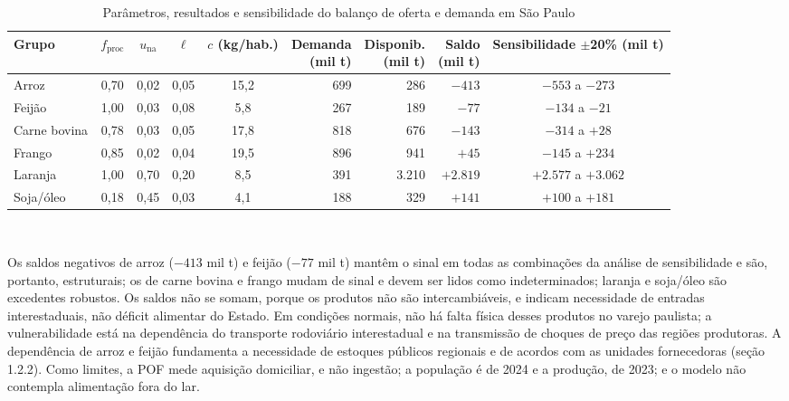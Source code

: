 \documentclass[
	12pt,				%
	openright,			%
	oneside,			%
	a4paper,			%
	chapter=TITLE,		%
	section=TITLE,		%
	english,			%
	french,				%
	spanish,			%
	brazil,				%
 ]{abntex2}
\begin{document}
\begin{table}[!htbp]
\centering
\caption{Parâmetros, resultados e sensibilidade do balanço de oferta e demanda em São Paulo}
\label{tab:balanco-oferta-demanda-sp}
\footnotesize
\setlength{\tabcolsep}{3pt}
\begin{tabular}{|l|c|c|c|c|r|r|r|c|}
\hline
\textbf{Grupo} & $f_{\mathrm{proc}}$ & $u_{\mathrm{na}}$ & $\ell$ & \shortstack{$c$\\(kg/hab.)} & \shortstack{\textbf{Demanda}\\(mil t)} & \shortstack{\textbf{Disponib.}\\(mil t)} & \shortstack{\textbf{Saldo}\\(mil t)} & \shortstack{\textbf{Sensibilidade}\\$\pm$20\% (mil t)} \\
\hline
Arroz        & 0,70 & 0,02 & 0,05 & 15,2 & 699 & 286   & $-413$ & $-553$ a $-273$ \\
\hline
Feijão       & 1,00 & 0,03 & 0,08 & 5,8  & 267 & 189   & $-77$  & $-134$ a $-21$ \\
\hline
Carne bovina & 0,78 & 0,03 & 0,05 & 17,8 & 818 & 676   & $-143$ & $-314$ a $+28$ \\
\hline
Frango       & 0,85 & 0,02 & 0,04 & 19,5 & 896 & 941   & $+45$  & $-145$ a $+234$ \\
\hline
Laranja      & 1,00 & 0,70 & 0,20 & 8,5  & 391 & 3.210 & $+2.819$ & $+2.577$ a $+3.062$ \\
\hline
Soja/óleo    & 0,18 & 0,45 & 0,03 & 4,1  & 188 & 329   & $+141$ & $+100$ a $+181$ \\
\hline
\end{tabular}
\\
\end{table}

Os saldos negativos de arroz ($-413$ mil t) e feijão ($-77$ mil t) mantêm o
sinal em todas as combinações da análise de sensibilidade e são, portanto,
estruturais; os de carne bovina e frango mudam de sinal e devem ser lidos como
indeterminados; laranja e soja/óleo são excedentes robustos. Os saldos não se
somam, porque os produtos não são intercambiáveis, e indicam necessidade de
entradas interestaduais, não déficit alimentar do Estado. Em condições normais,
não há falta física desses produtos no varejo paulista; a vulnerabilidade está
na dependência do transporte rodoviário interestadual e na transmissão de
choques de preço das regiões produtoras. A dependência de
arroz e feijão fundamenta a necessidade de estoques públicos regionais e de
acordos com as unidades fornecedoras (seção 1.2.2). Como limites, a POF mede
aquisição domiciliar, e não ingestão; a população é de 2024 e a produção, de
2023; e o modelo não contempla alimentação fora do lar.
\end{document}
